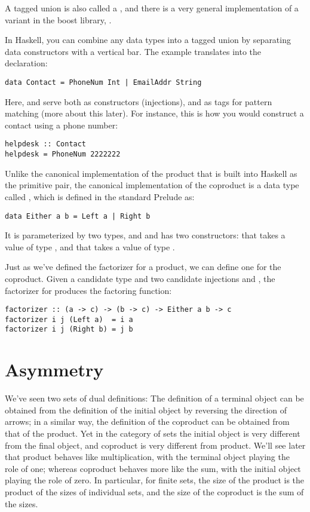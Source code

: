 A tagged union is also called a , and there is a very
general implementation of a variant in the boost library,
.

In Haskell, you can combine any data types into a tagged union by
separating data constructors with a vertical bar. The 
example translates into the declaration:

\begin{Verbatim}
data Contact = PhoneNum Int | EmailAddr String
\end{Verbatim}
Here,  and  serve both as
constructors (injections), and as tags for pattern matching (more about
this later). For instance, this is how you would construct a contact
using a phone number:

\begin{Verbatim}
helpdesk :: Contact
helpdesk = PhoneNum 2222222
\end{Verbatim}
Unlike the canonical implementation of the product that is built into
Haskell as the primitive pair, the canonical implementation of the
coproduct is a data type called , which is defined in the
standard Prelude as:

\begin{Verbatim}
data Either a b = Left a | Right b
\end{Verbatim}
It is parameterized by two types,  and  and has two
constructors:  that takes a value of type , and
 that takes a value of type .

Just as we've defined the factorizer for a product, we can define one
for the coproduct. Given a candidate type  and two candidate
injections  and , the factorizer for 
produces the factoring function:

\begin{Verbatim}
factorizer :: (a -> c) -> (b -> c) -> Either a b -> c
factorizer i j (Left a)  = i a
factorizer i j (Right b) = j b
\end{Verbatim}

\section{Asymmetry}

We've seen two sets of dual definitions: The definition of a terminal
object can be obtained from the definition of the initial object by
reversing the direction of arrows; in a similar way, the definition of
the coproduct can be obtained from that of the product. Yet in the
category of sets the initial object is very different from the final
object, and coproduct is very different from product. We'll see later
that product behaves like multiplication, with the terminal object
playing the role of one; whereas coproduct behaves more like the sum,
with the initial object playing the role of zero. In particular, for
finite sets, the size of the product is the product of the sizes of
individual sets, and the size of the coproduct is the sum of the sizes.

